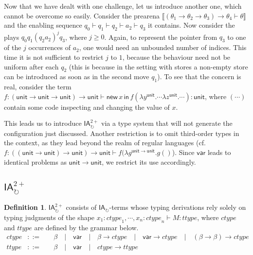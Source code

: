 \documentclass{CSML}
\theoremstyle{definition}\newtheorem{definition}[thm]{Definition}
\theoremstyle{definition}\newtheorem{example}[thm]{Example}
\theoremstyle{definition}\newtheorem{proposition}[thm]{Proposition}
\theoremstyle{definition}\newtheorem{lemma}[thm]{Lemma}
\theoremstyle{definition}\newtheorem{theorem}[thm]{Theorem}
\theoremstyle{definition}\newtheorem{corollary}[thm]{Corollary}
\theoremstyle{definition}\newtheorem{remark}[thm]{Remark}
\newcommand\nt[1]{#1}
\newcommand\ctype{\mathit{ctype}}
\newcommand\ttype{\mathit{ttype}}
\newcommand\ialoop{\mathsf{IA}_{\circlearrowright}}
\newcommand\iatwo{\ialoop^{2+}}
\newcommand\comt{\mathsf{unit}}
\newcommand\vart{\mathsf{var}}
\newcommand{\rarr}{\rightarrow}
\newcommand\sem[1]{\llbracket #1 \rrbracket}
\newcommand\seq[2]{{#1} \vdash {#2}}
\newcommand\new[2]{\mathsf{new}\,#1\,\mathsf{in}\,#2}
\begin{document}
Now that we have dealt with one challenge, let us introduce another one, which
cannot be overcome so easily. Consider the \nt{prearena} 
$\sem{\seq{(\theta_1\rarr\theta_2\rarr\theta_3)\rarr\theta_4}{\theta}}$ and the enabling 
sequence $q_0\vdash q_1 \vdash q_2 \vdash a_2 \vdash q_3$ it contains. Now
consider the plays $q_0 q_1 (q_2 a_2)^j q_3$, where $j\ge 0$. Again, to represent
the pointer from $q_3$ to one of the $j$ occurrences of $a_2$, one would need an unbounded number of indices.
This time it is not sufficient to restrict $j$ to $1$, because the behaviour need not be uniform
after each $q_2$ (this is because in the setting with stores a non-empty store
can be introduced as soon as in the second move $q_1$). To see that the concern is real,
consider the term 
$
\seq{f:(\comt\rarr\comt\rarr\comt)\rarr\comt}{\new{x}{f(\lambda y^\comt.\cdots\lambda z^\comt.\cdots):\comt}}
$,
where $(\cdots)$ contain some code inspecting and changing the value of $x$.

This leads us to introduce $\iatwo$ via a type system that will not generate the configuration
just discussed. Another restriction is to omit third-order types in the context, as
they lead beyond the realm of regular languages 
(cf. $\seq{f:((\comt\rarr\comt)\rarr\comt)\rarr\comt}{f(\lambda g^{\comt\rarr\comt}.g()}$).
Since $\vart$ leads to identical problems as $\comt\rarr\comt$, we restrict its use
accordingly.

\subsection{\texorpdfstring{$\iatwo$}{IA2+}}

\begin{definition}
$\iatwo$ consists of $\ialoop$-terms whose typing derivations rely solely on typing
judgments of the shape
$
\seq{x_1:\ctype_1,\cdots,x_n:\ctype_n}{M:\ttype}
$,
where $\ctype$ and $\ttype$ are defined by the grammar below.
\[\begin{array}{rll}
\ctype &::=\quad &\beta \quad|\quad \vart \quad|\quad \beta\rarr\ctype \quad|\quad \vart\rarr\ctype \quad|\quad (\beta\rarr\beta)\rarr\ctype\\
\ttype  &::= &\beta\quad|\quad\vart \quad|\quad \ctype\rarr\ttype 
\end{array}\]
\end{definition}\medskip
\end{document}
